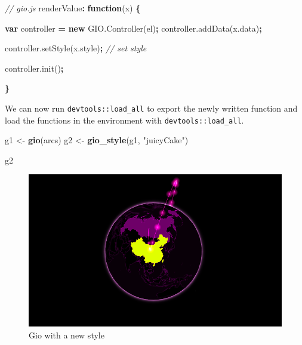 \documentclass[
]{krantz}
\makeatletter
\newenvironment{Shaded}{\begin{snugshade}}{\end{snugshade}}
\newcommand{\AttributeTok}[1]{\textcolor[rgb]{0.61,0.61,0.61}{#1}}
\newcommand{\CommentTok}[1]{\textcolor[rgb]{0.37,0.37,0.37}{\textit{#1}}}
\newcommand{\KeywordTok}[1]{\textcolor[rgb]{0.27,0.27,0.27}{\textbf{#1}}}
\newcommand{\NormalTok}[1]{#1}
\newcommand{\OperatorTok}[1]{\textcolor[rgb]{0.43,0.43,0.43}{\textbf{#1}}}
\newcommand{\StringTok}[1]{\textcolor[rgb]{0.5,0.5,0.5}{#1}}
\newcommand{\VariableTok}[1]{\textcolor[rgb]{0,0,0}{#1}}
\newenvironment{kframe}{%
\medskip{}
\setlength{\fboxsep}{.8em}
 \def\at@end@of@kframe{}%
 \ifinner\ifhmode%
  \def\at@end@of@kframe{\end{minipage}}%
  \begin{minipage}{\columnwidth}%
 \fi\fi%
 \def\FrameCommand##1{\hskip\@totalleftmargin \hskip-\fboxsep
 \colorbox{shadecolor}{##1}\hskip-\fboxsep
     \hskip-\linewidth \hskip-\@totalleftmargin \hskip\columnwidth}%
 \MakeFramed {\advance\hsize-\width
   \@totalleftmargin\z@ \linewidth\hsize
   \@setminipage}}%
 {\par\unskip\endMakeFramed%
 \at@end@of@kframe}
\renewenvironment{Shaded}{\begin{kframe}}{\end{kframe}}
\makeatother
\begin{document}
\begin{Shaded}
\begin{Highlighting}[]
\CommentTok{// gio.js}
\NormalTok{renderValue}\OperatorTok{:} \KeywordTok{function}\NormalTok{(x) }\OperatorTok{\{}

  \KeywordTok{var}\NormalTok{ controller }\OperatorTok{=} \KeywordTok{new} \VariableTok{GIO}\NormalTok{.}\AttributeTok{Controller}\NormalTok{(el)}\OperatorTok{;}
  \VariableTok{controller}\NormalTok{.}\AttributeTok{addData}\NormalTok{(}\VariableTok{x}\NormalTok{.}\AttributeTok{data}\NormalTok{)}\OperatorTok{;} 

  \VariableTok{controller}\NormalTok{.}\AttributeTok{setStyle}\NormalTok{(}\VariableTok{x}\NormalTok{.}\AttributeTok{style}\NormalTok{)}\OperatorTok{;} \CommentTok{// set style}

  \VariableTok{controller}\NormalTok{.}\AttributeTok{init}\NormalTok{()}\OperatorTok{;}

\OperatorTok{\}}
\end{Highlighting}
\end{Shaded}

We can now run \texttt{devtools::load\_all} to export the newly written function and load the functions in the environment with \texttt{devtools::load\_all}.

\begin{Shaded}
\begin{Highlighting}[]
\NormalTok{g1 <{-}}\StringTok{ }\KeywordTok{gio}\NormalTok{(arcs)}
\NormalTok{g2 <{-}}\StringTok{ }\KeywordTok{gio\_style}\NormalTok{(g1, }\StringTok{"juicyCake"}\NormalTok{)}

\NormalTok{g2}
\end{Highlighting}
\end{Shaded}

\begin{figure}
\centering
\includegraphics{images/gio-style.png}
\caption{Gio with a new style}
\end{figure}
\end{document}
